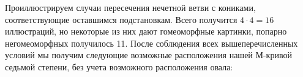 \documentclass[11pt]{book}
\numberwithin{exercise}{chapter}
\begin{document}
\begin{figure}[H]
\caption{}
\label{fig:prohibit_3_case_loc_odd_brunch}
\end{figure}


Проиллюстрируем случаи пересечения нечетной ветви с кониками, соответствующие оставшимся подстановкам. Всего получится $4 \cdot 4 = 16$ иллюстраций, но некоторые из них дают гомеоморфные картинки, попарно негомеоморфных получилось 11. 
После соблюдения всех вышеперечисленных условий мы получим следующие возможные расположения нашей М-кривой седьмой степени, без учета возможного расположения овала:
\end{document}
